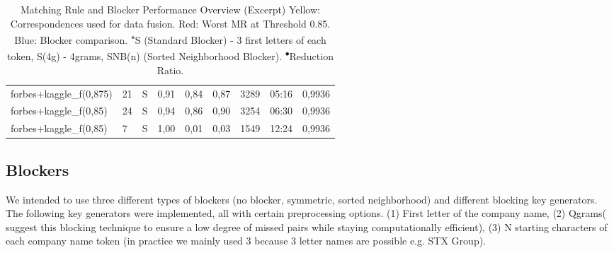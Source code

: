 \documentclass[11pt,titlepage,oneside,openany]{article}
\begin{document}
\begin{table}[]
\begin{tabular}{llcllllll}
		forbes+kaggle\_f(0,875)     & 21                              & S          & 0,91                           & 0,84                           & 0,87                            & 3289                                & 05:16                             & 0,9936                          \\
		forbes+kaggle\_f(0,85)      & 24                              & S          & 0,94                           & 0,86                           & 0,90                            & 3254                                & 06:30                             & 0,9936                          \\
		\rowcolor[HTML]{FCCCC8} 
		forbes+kaggle\_f(0,85)      & 7                               & S          & 1,00                           & 0,01                           & 0,03                            & 1549                                & 12:24                             & 0,9936                         
	\end{tabular}
\caption[Matching Rule and Blocker Performance Overview (Excerpt)]{Matching Rule and Blocker Performance Overview (Excerpt) \medspace\small Yellow: Correspondences used for data fusion. Red: Worst MR at Threshold 0.85. Blue: Blocker comparison. \textsuperscript{$\star$}S (Standard Blocker) - 3 first letters of each token, S(4g) - 4grams, SNB(n) (Sorted Neighborhood Blocker). \textsuperscript{$\bullet$}Reduction Ratio.}
\label{tab:mr-performance}

\end{table}




\subsection{Blockers}
\label{sec:blockers}

We intended to use three different types of blockers (no blocker, symmetric, sorted neighborhood) and different blocking key generators. The following key generators were implemented, all with certain preprocessing options. (1) First letter of the company name, (2) Qgrams(\cite{gravano_approximate_nodate} suggest this blocking technique to ensure a low degree of missed pairs while staying computationally efficient), (3) N starting characters of each company name token (in practice we mainly used 3 because 3 letter names are possible e.g. STX Group).
\end{document}
